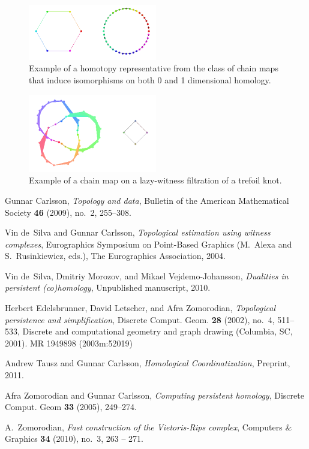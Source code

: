 \begin{figure}
\centering
\includegraphics[width=0.5\textwidth]{Adams_Henry/images/hom_circle.png}
\caption{Example of a homotopy representative from the class of chain maps that induce isomorphisms on both 0 and 1 dimensional homology.} \label{hom_circle}
\end{figure}

\begin{figure}
\centering
\includegraphics[width=0.5\textwidth]{Adams_Henry/images/hom_trefoil.png}
\caption{Example of a chain map on a lazy-witness filtration of a trefoil knot.} \label{hom_trefoil}
\end{figure}

\begin{thebibliography}{4}
Gunnar Carlsson, \emph{{Topology and data}}, Bulletin of the American
  Mathematical Society \textbf{46} (2009), no.~2, 255--308.

Vin de~Silva and Gunnar Carlsson, \emph{{Topological estimation using witness
  complexes}}, Eurographics Symposium on Point-Based Graphics (M.~Alexa and
  S.~Rusinkiewicz, eds.), The Eurographics Association, 2004.

Vin de~Silva, Dmitriy Morozov, and Mikael Vejdemo-Johansson, \emph{{Dualities
  in persistent (co)homology}}, Unpublished manuscript, 2010.

Herbert Edelsbrunner, David Letscher, and Afra Zomorodian, \emph{Topological
  persistence and simplification}, Discrete Comput. Geom. \textbf{28} (2002),
  no.~4, 511--533, Discrete and computational geometry and graph drawing
  (Columbia, SC, 2001). MR 1949898 (2003m:52019)

Andrew Tausz and Gunnar Carlsson, \emph{{Homological Coordinatization}},
  Preprint, 2011.

Afra Zomorodian and Gunnar Carlsson, \emph{Computing persistent homology},
  Discrete Comput. Geom \textbf{33} (2005), 249--274.

A.~Zomorodian, \emph{Fast construction of the {V}ietoris-{R}ips complex},
  Computers \& Graphics \textbf{34} (2010), no.~3, 263 -- 271.

\end{thebibliography}